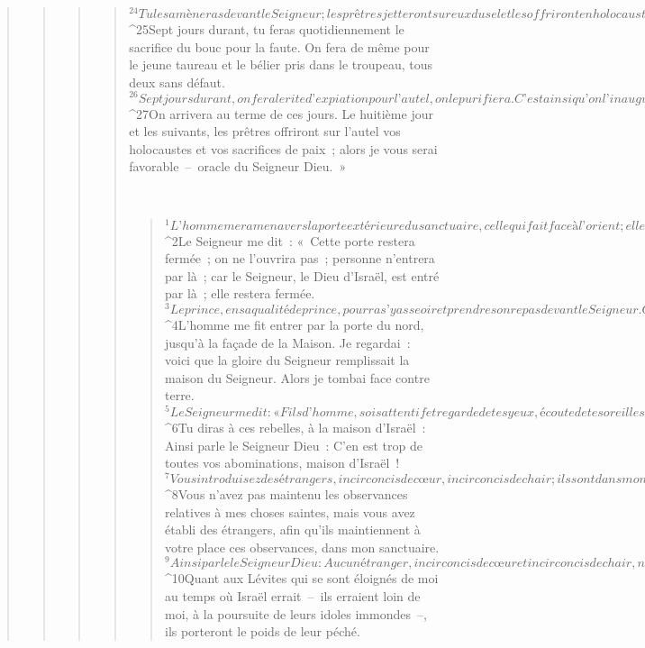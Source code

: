 \begin{verse}
\begin{verse}
\begin{verse}
\begin{verse}
${}^{24}Tu les amèneras devant le Seigneur ; les prêtres jetteront sur eux du sel et les offriront en holocauste pour le Seigneur. 
${}^{25}Sept jours durant, tu feras quotidiennement le sacrifice du bouc pour la faute. On fera de même pour le jeune taureau et le bélier pris dans le troupeau, tous deux sans défaut. 
${}^{26}Sept jours durant, on fera le rite d’expiation pour l’autel, on le purifiera. C’est ainsi qu’on l’inaugurera. 
${}^{27}On arrivera au terme de ces jours. Le huitième jour et les suivants, les prêtres offriront sur l’autel vos holocaustes et vos sacrifices de paix ; alors je vous serai favorable – oracle du Seigneur Dieu. »
      
         
      \bchapter{}
      \begin{verse}
${}^{1}L’homme me ramena vers la porte extérieure du sanctuaire, celle qui fait face à l’orient ; elle était fermée. 
${}^{2}Le Seigneur me dit : « Cette porte restera fermée ; on ne l’ouvrira pas ; personne n’entrera par là ; car le Seigneur, le Dieu d’Israël, est entré par là ; elle restera fermée. 
${}^{3}Le prince, en sa qualité de prince, pourra s’y asseoir et prendre son repas devant le Seigneur. C’est par le vestibule de la porte qu’il entrera, et il sortira par ce chemin. »
${}^{4}L’homme me fit entrer par la porte du nord, jusqu’à la façade de la Maison. Je regardai : voici que la gloire du Seigneur remplissait la maison du Seigneur. Alors je tombai face contre terre. 
${}^{5}Le Seigneur me dit : « Fils d’homme, sois attentif et regarde de tes yeux, écoute de tes oreilles tout ce que je vais te dire au sujet de toutes les prescriptions relatives à la maison du Seigneur et concernant toutes ses lois ; sois attentif à ceux qui entrent dans la Maison et à tous ceux qui sortent du sanctuaire. 
${}^{6}Tu diras à ces rebelles, à la maison d’Israël : Ainsi parle le Seigneur Dieu : C’en est trop de toutes vos abominations, maison d’Israël ! 
${}^{7}Vous introduisez des étrangers, incirconcis de cœur, incirconcis de chair ; ils sont dans mon sanctuaire, ils profanent ma Maison ; et puis vous présentez ma nourriture – la graisse et le sang. Vous rompez mon alliance par toutes vos abominations ! 
${}^{8}Vous n’avez pas maintenu les observances relatives à mes choses saintes, mais vous avez établi des étrangers, afin qu’ils maintiennent à votre place ces observances, dans mon sanctuaire. 
${}^{9}Ainsi parle le Seigneur Dieu : Aucun étranger, incirconcis de cœur et incirconcis de chair, n’entrera dans mon sanctuaire ; aucun étranger qui réside au milieu des fils d’Israël.
${}^{10}Quant aux Lévites qui se sont éloignés de moi au temps où Israël errait – ils erraient loin de moi, à la poursuite de leurs idoles immondes –, ils porteront le poids de leur péché. 

\end{verse}
\end{verse}
\end{verse}
\end{verse}
\end{verse}
